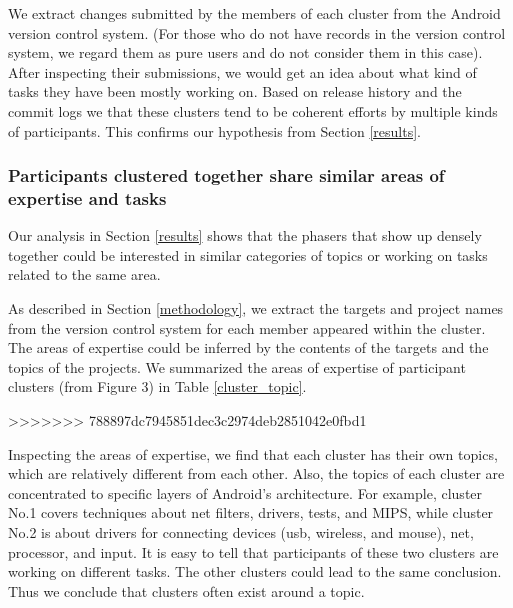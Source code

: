 \documentclass[conference]{IEEEtran}
\begin{document}
We extract changes submitted by the members of each cluster from the
Android version control system. (For those who do not have records in
the version control system, we regard them as pure users and do not
consider them in this case). After inspecting their submissions, we
would get an idea about what kind of tasks they have been mostly
working on.  
Based on release history and the commit logs we 
that these clusters tend to be coherent efforts by multiple kinds of participants.
This confirms our hypothesis
from Section \ref{results}.




\subsubsection{Participants clustered together share similar areas of expertise and tasks}

Our analysis in Section \ref{results} shows that the phasers that show
up densely together could be interested in similar categories of
topics or working on tasks related to the same area.


As described in Section \ref{methodology}, we extract the targets and
project names from the version control system for each member appeared
within the cluster. The areas of expertise could be inferred by the contents
of the targets and the topics of the projects. We summarized the
areas of expertise of participant clusters (from Figure 3)
 in Table \ref{cluster_topic}.


>>>>>>> 788897dc7945851dec3c2974deb2851042e0fbd1

Inspecting the areas of expertise, we find that each cluster has their own
topics, which are relatively different from each other. Also, the topics of
each cluster are concentrated to specific layers of Android's architecture.
For example, cluster No.1 covers techniques about net filters,
drivers, tests, and MIPS, while cluster No.2 is about drivers for
connecting devices (usb, wireless, and mouse), net, processor, and
input. 
It is easy to tell that participants of these two clusters are
working on different tasks. 
The other clusters could lead to the same
conclusion. 
Thus we conclude that clusters often exist around a topic.
\end{document}
